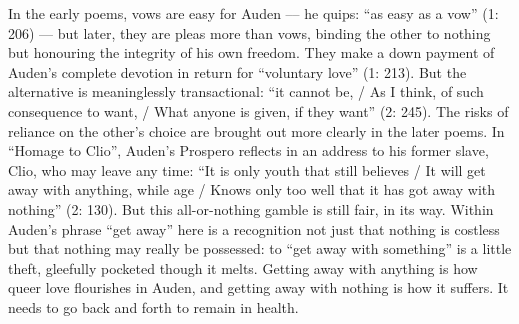 \begin{review}
In the early poems, vows are easy for Auden –– he quips: ``as easy as a
vow'' (1: 206) –– but later, they are pleas more than vows, binding the
other to nothing but honouring the integrity of his own freedom. They
make a down payment of Auden's complete devotion in return for
``voluntary love'' (1: 213). But the alternative is meaninglessly transactional:
``it cannot be, / As I think, of such consequence to want, / What anyone
is given, if they want'' (2: 245). The risks of reliance on the other's choice are brought out more clearly in the later poems. In ``Homage to Clio'', Auden's
Prospero reflects in an address to his former slave, Clio, who may leave
any time: ``It is only youth that still believes / It will get away with
anything, while age / Knows only too well that it has got away with
nothing'' (2: 130). But this all-or-nothing gamble is still fair, in its way. Within Auden's phrase ``get away'' here is a recognition
not just that nothing is costless but that nothing may really be
possessed: to ``get away with something'' is a little theft, gleefully
pocketed though it melts. Getting away with anything is how queer love
flourishes in Auden, and getting away with nothing is how it suffers. It
needs to go back and forth to remain in health.


\begin{flushleft}
    \renewcommand*{\mkbibnamefamily}[1]{\textsc{#1}}
    \renewcommand*{\mkbibnamegiven}[1]{\textsc{#1}} 
\printbibliography
\end{flushleft}

\end{review}